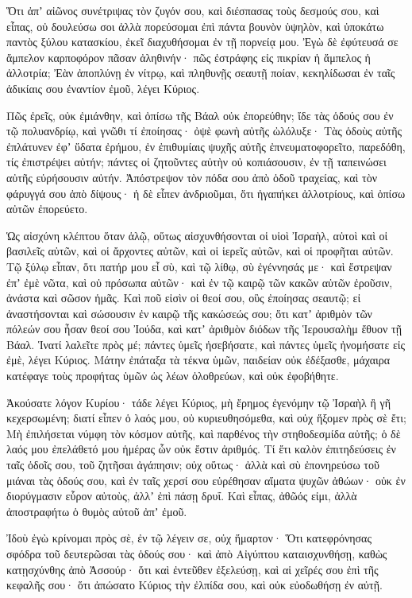 {\par }{\PP {}Ὅτι ἀπʼ αἰῶνος συνέτριψας τὸν ζυγόν σου, καὶ διέσπασας τοὺς δεσμούς σου, καὶ εἶπας, οὐ δουλεύσω σοι ἀλλὰ πορεύσομαι ἐπὶ πάντα βουνὸν ὑψηλὸν, καὶ ὑποκάτω παντὸς ξύλου κατασκίου, ἐκεῖ διαχυθήσομαι ἐν τῇ πορνείᾳ μου.
Ἐγὼ δὲ ἐφύτευσά σε ἄμπελον καρποφόρον πᾶσαν ἀληθινήν· πῶς ἐστράφης εἰς πικρίαν ἡ ἄμπελος ἡ ἀλλοτρία;
Ἐὰν ἀποπλύνῃ ἐν νίτρῳ, καὶ πληθυνῇς σεαυτῇ ποίαν, κεκηλίδωσαι ἐν ταῖς ἀδικίαις σου ἐναντίον ἐμοῦ, λέγει Κύριος.
\par }{\PP {}Πῶς ἐρεῖς, οὐκ ἐμιάνθην, καὶ ὀπίσω τῆς Βάαλ οὐκ ἐπορεύθην; ἴδε τὰς ὁδούς σου ἐν τῷ πολυανδρίῳ, καὶ γνῶθι τί ἐποίησας· ὀψὲ φωνὴ αὐτῆς ὠλόλυξε·
Τὰς ὁδοὺς αὐτῆς ἐπλάτυνεν ἐφʼ ὕδατα ἐρήμου, ἐν ἐπιθυμίαις ψυχῆς αὐτῆς ἐπνευματοφορεῖτο, παρεδόθη, τίς ἐπιστρέψει αὐτήν; πάντες οἱ ζητοῦντες αὐτὴν οὐ κοπιάσουσιν, ἐν τῇ ταπεινώσει αὐτῆς εὑρήσουσιν αὐτήν.
Ἀπόστρεψον τὸν πόδα σου ἀπὸ ὁδοῦ τραχείας, καὶ τὸν φάρυγγά σου ἀπὸ δίψους· ἡ δὲ εἶπεν ἀνδριοῦμαι, ὅτι ἠγαπήκει ἀλλοτρίους, καὶ ὀπίσω αὐτῶν ἐπορεύετο.
\par }{\PP {}Ὡς αἰσχύνη κλέπτου ὅταν ἁλῷ, οὕτως αἰσχυνθήσονται οἱ υἱοὶ Ἰσραὴλ, αὐτοὶ καὶ οἱ βασιλεῖς αὐτῶν, καὶ οἱ ἄρχοντες αὐτῶν, καὶ οἱ ἱερεῖς αὐτῶν, καὶ οἱ προφῆται αὐτῶν.
Τῷ ξύλῳ εἶπαν, ὅτι πατήρ μου εἶ σὺ, καὶ τῷ λίθῳ, σὺ ἐγέννησάς με· καὶ ἔστρεψαν ἐπʼ ἐμὲ νῶτα, καὶ οὐ πρόσωπα αὐτῶν· καὶ ἐν τῷ καιρῷ τῶν κακῶν αὐτῶν ἐροῦσιν, ἀνάστα καὶ σῶσον ἡμᾶς.
Καὶ ποῦ εἰσὶν οἱ θεοί σου, οὓς ἐποίησας σεαυτῷ; εἰ ἀναστήσονται καὶ σώσουσιν ἐν καιρῷ τῆς κακώσεώς σου; ὅτι κατʼ ἀριθμὸν τῶν πόλεών σου ἦσαν θεοί σου Ἰούδα, καὶ κατʼ ἀριθμὸν διόδων τῆς Ἱερουσαλὴμ ἔθυον τῇ Βάαλ.
Ἱνατί λαλεῖτε πρὸς μέ; πάντες ὑμεῖς ἠσεβήσατε, καὶ πάντες ὑμεῖς ἠνομήσατε εἰς ἐμὲ, λέγει Κύριος.
Μάτην ἐπάταξα τὰ τέκνα ὑμῶν, παιδείαν οὐκ ἐδέξασθε, μάχαιρα κατέφαγε τοὺς προφήτας ὑμῶν ὡς λέων ὀλοθρεύων, καὶ οὐκ ἐφοβήθητε.
\par }{\PP {}Ἀκούσατε λόγον Κυρίου· τάδε λέγει Κύριος, μὴ ἔρημος ἐγενόμην τῷ Ἰσραὴλ ἢ γῆ κεχερσωμένη; διατί εἶπεν ὁ λαός μου, οὐ κυριευθησόμεθα, καὶ οὐχ ἥξομεν πρὸς σὲ ἔτι;
Μὴ ἐπιλήσεται νύμφη τὸν κόσμον αὐτῆς, καὶ παρθένος τὴν στηθοδεσμίδα αὐτῆς; ὁ δὲ λαός μου ἐπελάθετό μου ἡμέρας ὧν οὐκ ἔστιν ἀριθμός.
Τί ἔτι καλὸν ἐπιτηδεύσεις ἐν ταῖς ὁδοῖς σου, τοῦ ζητῆσαι ἀγάπησιν; οὐχ οὕτως· ἀλλὰ καὶ σὺ ἐπονηρεύσω τοῦ μιάναι τὰς ὁδούς σου,
καὶ ἐν ταῖς χερσί σου εὑρέθησαν αἵματα ψυχῶν ἀθώων· οὐκ ἐν διορύγμασιν εὗρον αὐτοὺς, ἀλλʼ ἐπὶ πάσῃ δρυΐ.
Καὶ εἶπας, ἀθῶός εἰμι, ἀλλὰ ἀποστραφήτω ὁ θυμὸς αὐτοῦ ἀπʼ ἐμοῦ.
\par }{\PP Ἰδοὺ ἐγὼ κρίνομαι πρὸς σὲ, ἐν τῷ λέγειν σε, οὐχ ἥμαρτον·
Ὅτι κατεφρόνησας σφόδρα τοῦ δευτερῶσαι τὰς ὁδούς σου· καὶ ἀπὸ Αἰγύπτου καταισχυνθήσῃ, καθὼς κατῃσχύνθης ἀπὸ Ἀσσούρ·
ὅτι καὶ ἐντεῦθεν ἐξελεύσῃ, καὶ αἱ χεῖρές σου ἐπὶ τῆς κεφαλῆς σου· ὅτι ἀπώσατο Κύριος τὴν ἐλπίδα σου, καὶ οὐκ εὐοδωθήσῃ ἐν αὐτῇ.

}
